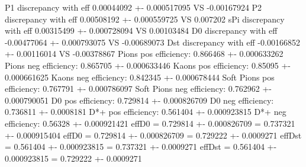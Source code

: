 P1 discrepancy with eff 0.00044092 +- 0.000517095 VS -0.00167924
P2 discrepancy with eff 0.00508192 +- 0.000559725 VS 0.007202
sPi discrepancy with eff 0.00315499 +- 0.000728094 VS 0.00103484
D0 discrepancy with eff -0.00477064 +- 0.000793075 VS -0.00689073
Dst discrepancy with eff -0.00166852 +- 0.00116014 VS -0.00378867
Pions pos efficiency: 0.866468 +- 0.000633262
Pions neg efficiency: 0.865705 +- 0.000633446
Kaons pos efficiency: 0.85095 +- 0.000661625
Kaons neg efficiency: 0.842345 +- 0.000678444
Soft Pions pos efficiency: 0.767791 +- 0.000786097
Soft Pions neg efficiency: 0.762962 +- 0.000790051
D0 pos efficiency: 0.729814 +- 0.000826709
D0 neg efficiency: 0.736811 +- 0.0008181
D*+ pos efficiency: 0.561404 +- 0.000923815
D*+ neg efficiency: 0.56328 +- 0.000921421
effD0 = 0.729814 +- 0.000826709 = 0.737321 +- 0.000915404
effD0 = 0.729814 +- 0.000826709 = 0.729222 +- 0.0009271
effDst = 0.561404 +- 0.000923815 = 0.737321 +- 0.0009271
effDst = 0.561404 +- 0.000923815 = 0.729222 +- 0.0009271